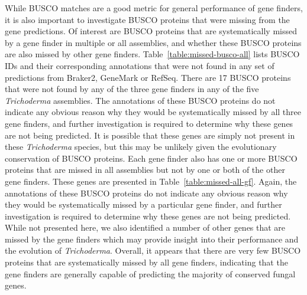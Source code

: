 While BUSCO matches are a good metric for general performance of gene
finders, it is also important to investigate BUSCO proteins that were missing from the gene predictions. Of interest are BUSCO proteins that are systematically missed by a gene finder in multiple or all assemblies, and whether these BUSCO proteins are also missed by other gene finders. Table~\ref{table:missed-busco-all} lists BUSCO IDs and their corresponding annotations that were not found in any set of predictions from Braker2, GeneMark or RefSeq. There are 17 BUSCO proteins that were not found by any of the three gene finders in any of the five \textit{Trichoderma} assemblies. The annotations of these BUSCO proteins do not indicate any obvious reason why they would be systematically missed by all three gene finders, and further investigation is required to determine why these genes are not being predicted. It is possible that these genes are simply not present in these \textit{Trichoderma} species, but this may be unlikely given the evolutionary conservation of BUSCO proteins. Each gene finder also has one or more BUSCO proteins that are missed in all assemblies but not by one or both of the other gene finders. These genes are presented in Table~\ref{table:missed-all-gf}. Again, the annotations of these BUSCO proteins do not indicate any obvious reason why they would be systematically missed by a particular gene finder, and further investigation is required to determine why these genes are not being predicted. While not presented here, we also identified a number of other genes that are missed by the gene finders which may provide insight into their performance and the evolution of \textit{Trichoderma}. Overall, it appears that there are very few BUSCO proteins that are systematically missed by all gene finders, indicating that the gene finders are generally capable of predicting the majority of conserved fungal genes.



